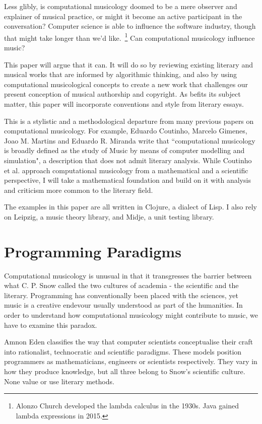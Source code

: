 \documentclass[numbers]{sigplanconf}
\begin{document}
Less glibly, is computational musicology doomed to be a mere observer and explainer of musical practice, or might it become an
active participant in the conversation? Computer science is able to influence the software industry, though that might take longer
than we'd like.~\footnote{Alonzo Church developed the lambda calculus in the 1930s. Java gained lambda expressions in 2015.}
Can computational musicology influence music?

This paper will argue that it can. It will do so by reviewing existing literary and musical works that are informed by algorithmic
thinking, and also by using computational musicological concepts to create a new work that challenges our present conception of
musical authorship and copyright. As befits its subject matter, this paper will incorporate conventions and style from literary
essays.

This is a stylistic and a methodological departure from many previous papers on computational musicology. For example, Eduardo
Coutinho, Marcelo Gimenes, Joao M. Martins and Eduardo R. Miranda write that ``computational musicology is broadly defined as the
study of Music by means of computer modelling and simulation"\cite{Computational Musicology}, a description that does not admit
literary analysis. While Coutinho et al. approach computational musicology from a mathematical and a scientific perspective,
I will take a mathematical foundation and build on it with analysis and criticism more common to the literary field.

The examples in this paper are all written in Clojure\cite{Clojure}, a dialect of Lisp. I also rely on Leipzig\cite{Leipzig},
a music theory library, and Midje\cite{Midje}, a unit testing library.

\section{Programming Paradigms}

Computational musicology is unusual in that it transgresses the barrier between what C. P. Snow called the two cultures of academia
- the scientific and the literary\cite{Two Cultures}. Programming has conventionally been placed with the sciences, yet music is a
creative endevour usually understood as part of the humanities. In order to understand how computational musicology might
contribute to music, we have to examine this paradox.

Amnon Eden classifies the way that computer scientists conceptualise their craft into rationalist, technocratic and scientific paradigms\cite{Three Paradigms}.
These models position programmers as mathematicians, engineers or scientists respectively. They vary in how they
produce knowledge, but all three belong to Snow's scientific culture. None value or use literary methods.
\end{document}
